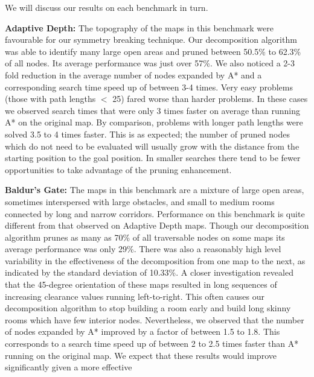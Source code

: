 We will discuss our results on each benchmark in turn.

\textbf{Adaptive Depth:} 
The topography of the maps in this benchmark were favourable for our
symmetry breaking technique.
Our decomposition algorithm was able to identify many large open areas and
pruned between 50.5\% to 62.3\% of all nodes.
Its average performance was just over 57\%. 
We also noticed a 2-3 fold reduction in the average number of nodes expanded 
by A* and a corresponding search time speed up of between 3-4 times.
Very easy problems (those with path lengths $<$ 25) fared worse than harder
problems. 
In these cases we observed search times that were only 3 times faster on average 
than running A* on the original map. 
By comparison, problems with longer path lengths were solved 3.5 to 4 times faster.
This is as expected; the number of pruned nodes which do not need to be evaluated
will usually grow with the distance from the starting position to the goal
position. In smaller searches there tend to be fewer opportunities to take advantage 
of the pruning enhancement.
%
\par
\textbf{Baldur's Gate: }
The maps in this benchmark are a mixture of large open areas, sometimes
interspersed with large obstacles, and small to medium rooms connected
by long and narrow corridors.
Performance on this benchmark is quite different from that observed on Adaptive Depth maps.
Though our decomposition algorithm prunes as many as 70\% of all traversable nodes 
on some maps its average performance was only 29\%. 
There was also a reasonably high level variability in the effectiveness of the 
decomposition from one map to the next, as indicated by the standard deviation
of 10.33\%.
A closer investigation revealed that the 45-degree orientation of these maps
resulted in long sequences of increasing clearance values running left-to-right.
This often causes our decomposition algorithm to stop building a room early and build long
skinny rooms which have few interior nodes.
Nevertheless, we observed that the number of nodes expanded by A* improved by a
factor of between 1.5 to 1.8. This corresponds to a search time speed up of between
2 to 2.5 times faster than A* running on the original map.
We expect that these results would improve significantly given a more effective
